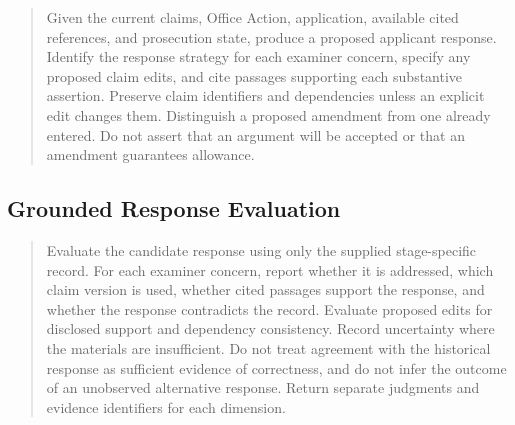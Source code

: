 \documentclass[11pt]{article}
\begin{document}
\begin{quote}
Given the current claims, Office Action, application, available cited references, and prosecution state, produce a proposed applicant response. Identify the response strategy for each examiner concern, specify any proposed claim edits, and cite passages supporting each substantive assertion. Preserve claim identifiers and dependencies unless an explicit edit changes them. Distinguish a proposed amendment from one already entered. Do not assert that an argument will be accepted or that an amendment guarantees allowance.
\end{quote}

\subsection{Grounded Response Evaluation}
\label{sec:prompt-evaluation}

\begin{quote}
Evaluate the candidate response using only the supplied stage-specific record. For each examiner concern, report whether it is addressed, which claim version is used, whether cited passages support the response, and whether the response contradicts the record. Evaluate proposed edits for disclosed support and dependency consistency. Record uncertainty where the materials are insufficient. Do not treat agreement with the historical response as sufficient evidence of correctness, and do not infer the outcome of an unobserved alternative response. Return separate judgments and evidence identifiers for each dimension.
\end{quote}
\end{document}
